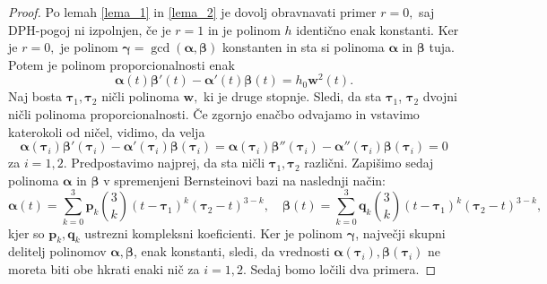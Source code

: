 \documentclass[12pt,a4paper,twoside]{article}
\theoremstyle{definition} %
\theoremstyle{plain} %
\theoremstyle{primerstyle}
\numberwithin{equation}{section}  %
\newcommand{\pV}{\mathbf{p}}
\newcommand{\qV}{\mathbf{q}}
\newcommand{\wV}{\mathbf{w}}
\newcommand{\balpha}{\boldsymbol \alpha}
\newcommand{\bbeta}{\boldsymbol \beta}
\newcommand{\bgamma}{\boldsymbol \gamma}
\newcommand{\btau}{\boldsymbol \tau}
\begin{document}
\begin{proof}
	Po lemah \ref{lema_1} in \ref{lema_2} je dovolj obravnavati primer $r=0,$ saj DPH-pogoj ni izpolnjen, če je $r=1$ in je polinom $h$ identično enak konstanti. Ker je $r=0,$ je polinom $\bgamma=\gcd(\balpha,\bbeta)$ konstanten in sta si polinoma $\balpha$ in $\bbeta$ tuja. Potem je polinom proporcionalnosti enak
	\begin{equation}
		\balpha(t)\bbeta'(t)-\balpha'(t)\bbeta(t)=h_0\wV^2(t).
	\end{equation}
	Naj bosta $\btau_1,\btau_2$ ničli polinoma $\wV,$ ki je druge stopnje. Sledi, da sta $\btau_1$, $\btau_2$ dvojni ničli polinoma proporcionalnosti. Če zgornjo enačbo odvajamo in vstavimo katerokoli od ničel, vidimo, da velja
	\begin{equation}
		\label{enacbe_propoly_tau}
		\balpha(\btau_i)\bbeta'(\btau_i)-\balpha'(\btau_i)\bbeta(\btau_i)=\balpha(\btau_i)\bbeta''(\btau_i)-\balpha''(\btau_i)\bbeta(\btau_i)=0
	\end{equation}
	za $i=1,2.$ Predpostavimo najprej, da sta ničli $\btau_1,\btau_2$ različni. Zapišimo sedaj polinoma $\balpha$ in $\bbeta$ v spremenjeni Bernsteinovi bazi na naslednji način:
	\begin{equation*}
		\balpha(t)=\sum_{k=0}^3\pV_k\binom{3}{k}(t-\btau_1)^k(\btau_2-t)^{3-k},\quad\bbeta(t)=\sum_{k=0}^3\qV_k\binom{3}{k}(t-\btau_1)^k(\btau_2-t)^{3-k},
	\end{equation*}
	kjer so $\pV_k,\qV_k$ ustrezni kompleksni koeficienti. Ker je polinom $\bgamma$, največji skupni delitelj polinomov $\balpha,\bbeta$, enak konstanti, sledi, da vrednosti $\balpha(\btau_i),\bbeta(\btau_i)$ ne moreta biti obe hkrati enaki nič za $i=1,2.$ Sedaj bomo ločili dva primera.
	

\end{proof}
\end{document}
